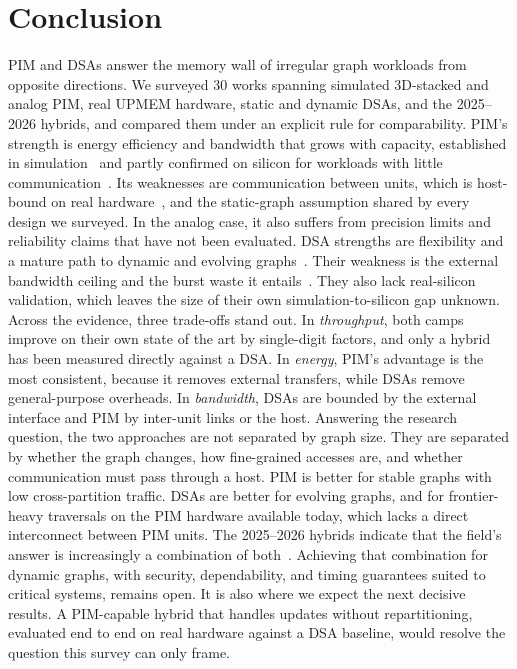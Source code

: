 \documentclass[journal,onecolumn]{IEEEtran}
\begin{document}
\section{Conclusion}
PIM and DSAs answer the memory wall of irregular graph workloads from opposite directions. We surveyed 30 works spanning simulated 3D-stacked and analog PIM, real UPMEM hardware, static and dynamic DSAs, and the 2025--2026 hybrids, and compared them under an explicit rule for comparability. PIM's strength is energy efficiency and bandwidth that grows with capacity, established in simulation~\cite{ahn2015tesseract,zhuo2019graphq} and partly confirmed on silicon for workloads with little communication~\cite{gomezluna2022prim,cai2024pimpam}. Its weaknesses are communication between units, which is host-bound on real hardware~\cite{gomezluna2022prim,barkhordar2025alphapim}, and the static-graph assumption shared by every design we surveyed. In the analog case, it also suffers from precision limits and reliability claims that have not been evaluated. DSA strengths are flexibility and a mature path to dynamic and evolving graphs~\cite{rahman2021jetstream,zhao2022tdgraph,gao2023mega}. Their weakness is the external bandwidth ceiling and the burst waste it entails~\cite{shin2025piccolo,chen2022regraph}. They also lack real-silicon validation, which leaves the size of their own simulation-to-silicon gap unknown. Across the evidence, three trade-offs stand out. In \emph{throughput}, both camps improve on their own state of the art by single-digit factors, and only a hybrid has been measured directly against a DSA. In \emph{energy}, PIM's advantage is the most consistent, because it removes external transfers, while DSAs remove general-purpose overheads. In \emph{bandwidth}, DSAs are bounded by the external interface and PIM by inter-unit links or the host. Answering the research question, the two approaches are not separated by graph size. They are separated by whether the graph changes, how fine-grained accesses are, and whether communication must pass through a host. PIM is better for stable graphs with low cross-partition traffic. DSAs are better for evolving graphs, and for frontier-heavy traversals on the PIM hardware available today, which lacks a direct interconnect between PIM units. The 2025--2026 hybrids indicate that the field's answer is increasingly a combination of both~\cite{shin2025piccolo,shin2025fala,yenimol2026cograf}. Achieving that combination for dynamic graphs, with security, dependability, and timing guarantees suited to critical systems, remains open. It is also where we expect the next decisive results. A PIM-capable hybrid that handles updates without repartitioning, evaluated end to end on real hardware against a DSA baseline, would resolve the question this survey can only frame.





\end{document}
